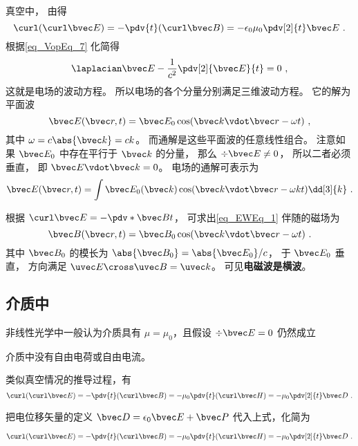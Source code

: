 
\begin{issues}
\issueDraft
{}
\end{issues}




真空中， 由得
\begin{equation}
\curl(\curl\bvec E) = -\pdv{t} (\curl\bvec B) = -\epsilon_0\mu_0 \pdv[2]{t} \bvec E~.
\end{equation}
根据\autoref{eq_VopEq_7}  化简得
\begin{equation}
\laplacian \bvec E - \frac{1}{c^2} \pdv[2]{\bvec E}{t} = 0~,
\end{equation}
这就是电场的波动方程。 所以电场的各个分量分别满足三维波动方程。%
它的解为平面波
\begin{equation}\label{eq_EWEq_1}
\bvec E(\bvec r, t) = \bvec E_0 \cos(\bvec k\vdot \bvec r - \omega t)~,
\end{equation}
其中 $\omega = c\abs{\bvec k} = ck$。 而通解是这些平面波的任意线性组合。 注意如果 $\bvec E_0$ 中存在平行于 $\bvec k$ 的分量， 那么 $\div \bvec E \ne 0$， 所以二者必须垂直， 即 $\bvec E \vdot \bvec k = 0$。 电场的通解可表示为
\begin{equation}
\bvec E(\bvec r, t) = \int \bvec E_0(\bvec k) \cos(\bvec k\vdot \bvec r - \omega k t) \dd[3]{k}~.
\end{equation}

根据 $\curl \bvec E = -\pdv*{\bvec B}{t}$， 可求出\autoref{eq_EWEq_1} 伴随的磁场为
\begin{equation}
\bvec B(\bvec r, t) = \bvec B_0 \cos(\bvec k \vdot \bvec r - \omega t)~.
\end{equation}
其中 $\bvec B_0$ 的模长为 $\abs{\bvec B_0} = \abs{\bvec E_0}/c$， 于 $\bvec E_0$ 垂直， 方向满足 $\uvec E \cross \uvec B = \uvec k$。 可见\textbf{电磁波是横波}。

\subsection{介质中}

非线性光学中一般认为介质具有 $\mu = \mu_0$，且假设 $\div\bvec E = 0$ 仍然成立

介质中没有自由电荷或自由电流。

类似真空情况的推导过程，有
\begin{equation}
\curl(\curl\bvec E) = -\pdv{t} (\curl\bvec B) = -\mu_0 \pdv{t} (\curl\bvec H)
= -\mu_0 \pdv[2]{t} \bvec D~.
\end{equation}

把电位移矢量的定义 $\bvec D = \epsilon_0\bvec E + \bvec P$ 代入上式，化简为

\begin{equation}
\curl(\curl\bvec E) = -\pdv{t} (\curl\bvec B) = -\mu_0 \pdv{t} (\curl\bvec H)
= -\mu_0 \pdv[2]{t} \bvec D~.
\end{equation}
